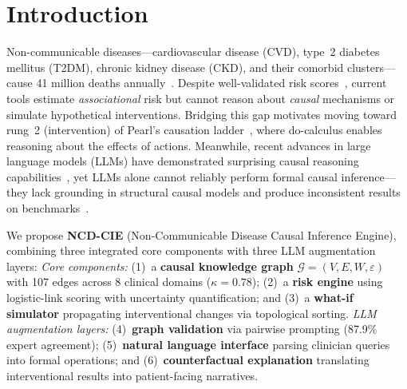 \documentclass[runningheads]{llncs}
\begin{document}
\section{Introduction}\label{sec:intro}

Non-communicable diseases---cardiovascular disease (CVD), type~2
diabetes mellitus (T2DM), chronic kidney disease (CKD), and their
comorbid clusters---cause 41 million deaths
annually~\cite{who2021ncd}.
Despite well-validated risk scores~\cite{dagostino2008,hippisley2017qrisk3,score22021},
current tools estimate \emph{associational} risk but cannot reason about
\emph{causal} mechanisms or simulate hypothetical interventions.
Bridging this gap motivates moving toward rung~2 (intervention)
of Pearl's causation ladder~\cite{pearl2018book}, where
do-calculus enables reasoning about the effects of actions.
Meanwhile, recent advances in large language models (LLMs) have
demonstrated surprising causal reasoning
capabilities~\cite{ma2024causal,kiciman2023causal}, yet LLMs alone
cannot reliably perform formal causal inference---they lack grounding
in structural causal models and produce inconsistent results on
benchmarks~\cite{jin2023cladder}.

We propose \textbf{NCD-CIE} (Non-Communicable Disease Causal Inference
Engine), combining three integrated core components with three
LLM augmentation layers:
\noindent\emph{Core components:}
(1)~a \textbf{causal knowledge graph} $\mathcal{G}=(V,E,W,\varepsilon)$
  with 107 edges across 8 clinical domains ($\kappa=0.78$);
(2)~a \textbf{risk engine} using logistic-link scoring with
  uncertainty quantification; and
(3)~a \textbf{what-if simulator} propagating interventional changes
  via topological sorting.
\emph{LLM augmentation layers:}
(4)~\textbf{graph validation} via pairwise prompting (87.9\% expert
  agreement);
(5)~\textbf{natural language interface} parsing clinician queries
  into formal operations; and
(6)~\textbf{counterfactual explanation} translating interventional
  results into patient-facing narratives.
\end{document}
